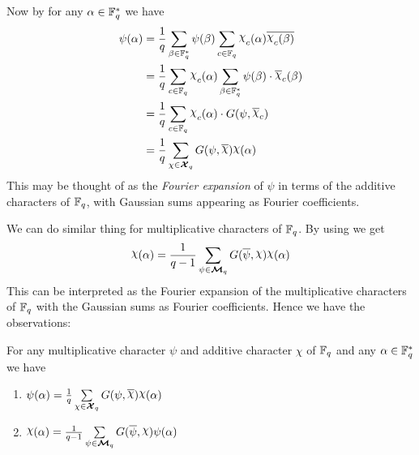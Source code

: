 Now by  for any $\alpha\in\mathbb{F}_q^*$ we have \begin{align*}
  \psi(\alpha) & =\frac1q\sum_{\beta\in \bbF_q^*}\psi(\beta)\sum_{c\in\bbF_q}\chi_{c}(\alpha)\ov{\chi_{c}(\beta)}  \\
               & =\frac1q\sum_{c\in\bbF_q}\chi_c(\alpha)\sum_{\beta\in\bbF_q^*}\psi(\beta)\cdot \ov{\chi}_c(\beta) \\
               & =\frac1q\sum_{c\in\bbF_q}\chi_c(\alpha)\cdot G(\psi,\ov{\chi}_c)                                  \\
               & =\frac1q\sum_{\oldchi\in\Xq}G(\psi,\ov{\chi})\chi(\alpha)
\end{align*}This may be thought of as the \emph{Fourier expansion} of $\psi$ in terms of the additive characters of $\mathbb{F}_q$, with Gaussian sums appearing as Fourier coefficients. 

We can do similar thing for multiplicative characters of $\mathbb{F}_q$. By using  we get $$\chi(\alpha)=\frac1{q-1}\sum_{\psi\in\Mq}G(\ov{\psi},\chi)\chi(\alpha)$$ This can be interpreted as the Fourier expansion of the multiplicative characters of $\mathbb{F}_q$ with the Gaussian sums as Fourier coefficients. Hence we have the observations:
\begin{observation}\label{obs:fourier-coeff-gaussian-sum}
  For any multiplicative character $\psi$ and additive character $\chi$ of $\mathbb{F}_q$ and any  $\alpha\in\mathbb{F}_q^*$ we have \begin{enumerate}[label=(\roman*)]
    \item $\psi(\alpha)=\frac1q\sum\limits_{\oldchi\in \Xq}G(\psi,\ov{\chi})\chi(\alpha)$ 
    \item $\chi(\alpha)=\frac1{q-1}\sum\limits_{\psi\in\Mq}G(\ov{\psi},\chi)\psi(\alpha)$
  \end{enumerate}
\end{observation}


